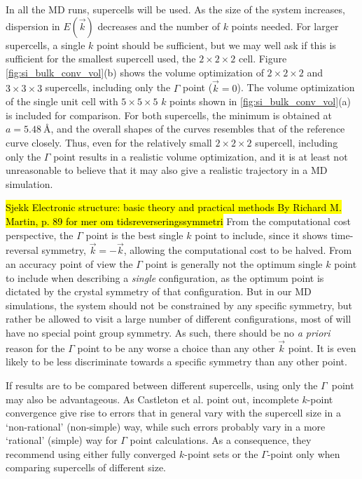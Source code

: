 \documentclass[11pt,bibliography=totoc,index=totoc]{scrbook}   %
\newcommand{\comment}[1]{\hl{#1}}
\begin{document}
In all the MD runs, supercells will be used. As the size of the system increases, dispersion in $E(\vec{k})$ decreases and the number of $k$ points needed.
For larger supercells, a single $k$ point should be sufficient, but we may well ask if this is sufficient for the smallest supercell used, the $2\times2\times2$ cell. 
Figure \ref{fig:si_bulk_conv_vol}(b) shows the volume optimization of $2\times2\times2$ and $3\times3\times3$ supercells,
including only the $\Gamma$ point ($\vec{k}=0$). The volume optimization of the single unit cell with $5\times 5\times5$ $k$ points shown
in \ref{fig:si_bulk_conv_vol}(a) is included for comparison. For both supercells, the minimum is obtained at $a=\SI{5.48}{\angstrom}$,
and the overall shapes of the curves resembles that of the reference curve closely.
Thus, even for the relatively small $2\times 2\times 2$ supercell, including only the $\Gamma$ point results in a realistic volume optimization,
and it is at least not unreasonable to believe that it may also give a realistic trajectory in a MD simulation. 

\comment{Sjekk 
Electronic structure: basic theory and practical methods By Richard M. Martin, p. 89 for mer om tidsreverseringssymmetri}
From the computational cost perspective, the $\Gamma$ point is the best single $k$ point to include, since it shows time-reversal symmetry, 
$\vec{k}=-\vec{k}$, allowing the computational cost to be halved. 
From an accuracy point of view the $\Gamma$ point is generally not the optimum single $k$ point to include when describing a \emph{single} configuration, as the optimum point is dictated by the crystal symmetry of that configuration\cite{Baldereschi:1973}. 
But in our MD simulations, the system should not be constrained by any specific symmetry, but rather be allowed to visit a large number of different configurations, most of will have no special point group symmetry. 
As such, there should be no \textit{a priori} reason for the $\Gamma$ point to be any worse a choice than any other $\vec{k}$ point. 
It is even likely to be less discriminate towards a specific symmetry than any other point.

If results are to be compared between different supercells, using only the $\Gamma$~point may also be advantageous.
As Castleton et al. point out\cite{Castleton:2009}, incomplete $k$-point convergence give rise to errors that in general vary with the supercell size in a `non-rational' (non-simple) way, while such errors probably vary in a more `rational' (simple) way for $\Gamma$ point calculations. 
As a consequence, they recommend using either fully converged $k$-point sets or the $\Gamma$-point only when comparing supercells of different size.
\end{document}
